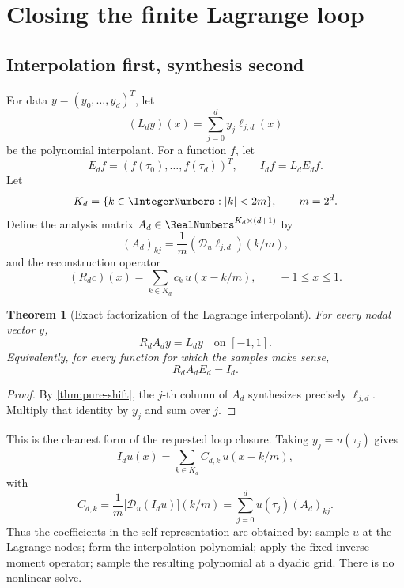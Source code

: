 \documentclass[11pt,oneside]{article}
\numberwithin{equation}{section}
\newtheorem{theorem}{Theorem}[section]
\theoremstyle{definition}
\theoremstyle{remark}
\newcommand{\calD}{\mathscr D_u}
\begin{document}
\section{Closing the finite Lagrange loop}
\label{sec:loop}

\subsection{Interpolation first, synthesis second}
For data \(y=(y_0,\ldots,y_d)^T\), let
\begin{equation}
 (L_dy)(x)=\sum_{j=0}^d y_j\ell_{j,d}(x)
 \label{eq:Ld}
\end{equation}
be the polynomial interpolant.  For a function \(f\), let
\begin{equation}
 E_df=(f(\tau_0),\ldots,f(\tau_d))^T,
 \qquad
 I_df=L_dE_df.
 \label{eq:Id}
\end{equation}
Let
\begin{equation}
 K_d=\{k\in\IntegerNumbers:|k|<2m\},\qquad m=2^d.
 \label{eq:Kd}
\end{equation}
Define the analysis matrix \(A_d\in\RealNumbers^{K_d\times(d+1)}\) by
\begin{equation}
 (A_d)_{k j}=\frac1m(\calD\ell_{j,d})(k/m),
 \label{eq:A-matrix}
\end{equation}
and the reconstruction operator
\begin{equation}
 (R_dc)(x)=\sum_{k\in K_d}c_k\,u(x-k/m),
 \qquad -1\le x\le1.
 \label{eq:Rop}
\end{equation}

\begin{theorem}[Exact factorization of the Lagrange interpolant]
\label{thm:factor}
For every nodal vector \(y\),
\begin{equation}
 \boxed{R_dA_dy=L_dy\quad\text{on }[-1,1].}
 \label{eq:RA=L}
\end{equation}
Equivalently, for every function for which the samples make sense,
\begin{equation}
 \boxed{R_dA_dE_d=I_d.}
 \label{eq:factor}
\end{equation}
\end{theorem}

\begin{proof}
By \cref{thm:pure-shift}, the \(j\)-th column of \(A_d\) synthesizes precisely
\(\ell_{j,d}\).  Multiply that identity by \(y_j\) and sum over \(j\).
\end{proof}

This is the cleanest form of the requested loop closure.  Taking
\(y_j=u(\tau_j)\) gives
\begin{equation}
 I_du(x)=\sum_{k\in K_d}C_{d,k}\,u(x-k/m),
 \label{eq:closed-level}
\end{equation}
with
\begin{equation}
 \boxed{
 C_{d,k}=\frac1m\bigl[\calD(I_du)\bigr](k/m)
 =\sum_{j=0}^d u(\tau_j)(A_d)_{kj}.}
 \label{eq:Cdk}
\end{equation}
Thus the coefficients in the self-representation are obtained by: sample \(u\) at
the Lagrange nodes; form the interpolation polynomial; apply the fixed inverse
moment operator; sample the resulting polynomial at a dyadic grid.  There is no
nonlinear solve.
\end{document}
